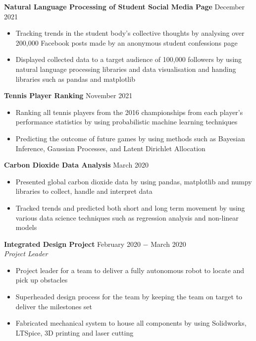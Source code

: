 \documentclass{article}
\begin{document}
\textbf{Natural Language Processing of Student Social Media Page} \hfill December 2021
\begin{itemize}
    \item Tracking trends in the student body's collective thoughts by analysing over 200,000 Facebook posts made by an anonymous student confessions page
    \item Displayed collected data to a target audience of 100,000 followers by using natural language processing libraries and data visualisation and handing libraries such as pandas and matplotlib
\end{itemize} \medskip

\textbf{Tennis Player Ranking} \hfill November 2021
\begin{itemize}
    \item Ranking all tennis players from the 2016 championships from each player's performance statistics by using probabilistic machine learning techniques
    \item Predicting the outcome of future games by using methods such as Bayesian Inference, Gaussian Processes, and Latent Dirichlet Allocation
\end{itemize} \medskip

\textbf{Carbon Dioxide Data Analysis} \hfill  March 2020
\begin{itemize}
    \item Presented global carbon dioxide data by using pandas, matplotlib and numpy libraries to collect, handle and interpret data
    \item Tracked trends and predicted both short and long term movement by using various data science techniques such as regression analysis and non-linear models
\end{itemize} \medskip

\textbf{Integrated Design Project} \hfill February 2020 $-$ March 2020\\
\textit{Project Leader}
\begin{itemize}
    \item Project leader for a team to deliver a fully autonomous robot to locate and pick up obstacles
    \item Superheaded design process for the team by keeping the team on target to deliver the milestones set
    \item Fabricated mechanical system to house all components by using Solidworks, LTSpice, 3D printing and laser cutting
\end{itemize} \medskip
\end{document}
